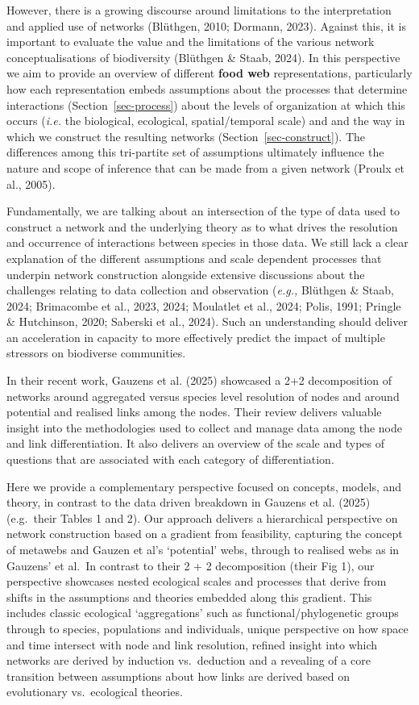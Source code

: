 \documentclass[
]{article}
\begin{document}
However, there is a growing discourse around limitations to the
interpretation and applied use of networks (Blüthgen, 2010; Dormann,
2023). Against this, it is important to evaluate the value and the
limitations of the various network conceptualisations of biodiversity
(Blüthgen \& Staab, 2024). In this perspective we aim to provide an
overview of different \textbf{food web} representations, particularly
how each representation embeds assumptions about the processes that
determine interactions (Section~\ref{sec-process}) about the levels of
organization at which this occurs (\emph{i.e.} the biological,
ecological, spatial/temporal scale) and and the way in which we
construct the resulting networks (Section~\ref{sec-construct}). The
differences among this tri-partite set of assumptions ultimately
influence the nature and scope of inference that can be made from a
given network (Proulx et al., 2005).

Fundamentally, we are talking about an intersection of the type of data
used to construct a network and the underlying theory as to what drives
the resolution and occurrence of interactions between species in those
data. We still lack a clear explanation of the different assumptions and
scale dependent processes that underpin network construction alongside
extensive discussions about the challenges relating to data collection
and observation (\emph{e.g.,} Blüthgen \& Staab, 2024; Brimacombe et
al., 2023, 2024; Moulatlet et al., 2024; Polis, 1991; Pringle \&
Hutchinson, 2020; Saberski et al., 2024). Such an understanding should
deliver an acceleration in capacity to more effectively predict the
impact of multiple stressors on biodiverse communities.

In their recent work, Gauzens et al. (2025) showcased a 2+2
decomposition of networks around aggregated versus species level
resolution of nodes and around potential and realised links among the
nodes. Their review delivers valuable insight into the methodologies
used to collect and manage data among the node and link differentiation.
It also delivers an overview of the scale and types of questions that
are associated with each category of differentiation.

Here we provide a complementary perspective focused on concepts, models,
and theory, in contrast to the data driven breakdown in Gauzens et al.
(2025) (e.g.~their Tables 1 and 2). Our approach delivers a hierarchical
perspective on network construction based on a gradient from
feasibility, capturing the concept of metawebs and Gauzen et al's
`potential' webs, through to realised webs as in Gauzens' et al.~In
contrast to their 2 + 2 decomposition (their Fig 1), our perspective
showcases nested ecological scales and processes that derive from shifts
in the assumptions and theories embedded along this gradient. This
includes classic ecological `aggregations' such as
functional/phylogenetic groups through to species, populations and
individuals, unique perspective on how space and time intersect with
node and link resolution, refined insight into which networks are
derived by induction vs.~deduction and a revealing of a core transition
between assumptions about how links are derived based on evolutionary
vs.~ecological theories.
\end{document}

